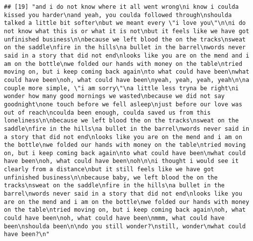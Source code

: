 \documentclass[]{article}
\begin{document}
\begin{verbatim}
## [19] "and i do not know where it all went wrong\ni know i coulda kissed you harder\nand yeah, you coulda followed through\nshoulda talked a little bit softer\nbut we meant every \"i love you\"\n\ni do not know what this is or what it is not\nbut it feels like we have got unfinished business\n\nbecause we left blood the on the tracks\nsweat on the saddle\nfire in the hills\na bullet in the barrel\nwords never said in a story that did not end\nlooks like you are on the mend and i am on the bottle\nwe folded our hands with money on the table\ntried moving on, but i keep coming back again\nto what could have been\nwhat could have been\noh, what could have been\nyeah, yeah, yeah, yeah\n\na couple more simple, \"i am sorry\"\na little less tryna be right\ni wonder how many good mornings we wasted\nbecause we did not say goodnight\none touch before we fell asleep\njust before our love was out of reach\ncoulda been enough, coulda saved us from this loneliness\n\nbecause we left blood the on the tracks\nsweat on the saddle\nfire in the hills\na bullet in the barrel\nwords never said in a story that did not end\nlooks like you are on the mend and i am on the bottle\nwe folded our hands with money on the table\ntried moving on, but i keep coming back again\nto what could have been\nwhat could have been\noh, what could have been\noh\n\ni thought i would see it clearly from a distance\nbut it still feels like we have got unfinished business\n\nbecause baby, we left blood the on the tracks\nsweat on the saddle\nfire in the hills\na bullet in the barrel\nwords never said in a story that did not end\nlooks like you are on the mend and i am on the bottle\nwe folded our hands with money on the table\ntried moving on, but i keep coming back again\noh, what could have been\noh, what could have been\nmmm, what could have been\nshoulda been\n\ndo you still wonder?\nstill, wonder\nwhat could have been?\n"                                                                                                                                                                                                                                                                                                                                                                                                                                                                                                                                                                                                                                                                                                                                                                                                                                                                                                                                                                                             

\end{verbatim}
\end{document}
